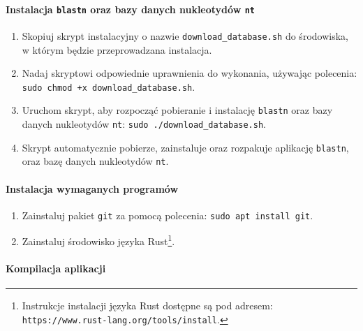             \paragraph{Instalacja \texttt{blastn} oraz bazy danych nukleotydów \texttt{nt}}

                \begin{enumerate}
                    \item {
                        Skopiuj skrypt instalacyjny o nazwie \texttt{download\_database.sh} do środowiska, w którym będzie przeprowadzana instalacja.
                    }
                    \item {
                        Nadaj skryptowi odpowiednie uprawnienia do wykonania, używając polecenia: \texttt{sudo chmod +x download\_database.sh}.
                    }
                    \item {
                        Uruchom skrypt, aby rozpocząć pobieranie i instalację \texttt{blastn} oraz bazy danych nukleotydów \texttt{nt}: \texttt{sudo ./download\_database.sh}.
                    }
                    \item {
                        Skrypt automatycznie pobierze, zainstaluje oraz rozpakuje aplikację \texttt{blastn}, oraz bazę danych nukleotydów \texttt{nt}.
                    }
                \end{enumerate}

            \paragraph{Instalacja wymaganych programów}

                \begin{enumerate}
                    \item {
                        Zainstaluj pakiet \texttt{git} za pomocą polecenia: \texttt{sudo apt install git}.
                    }
                    \item {
                        Zainstaluj środowisko języka Rust\footnote{Instrukcje instalacji języka Rust dostępne są pod adresem: \texttt{https://www.rust-lang.org/tools/install}.}.
                    }
                \end{enumerate}

            \paragraph{Kompilacja aplikacji}

